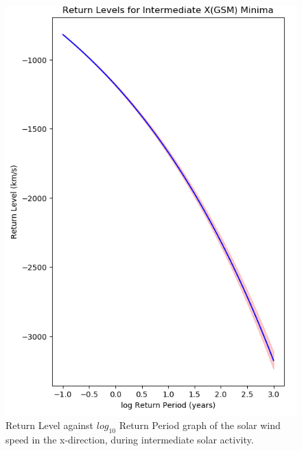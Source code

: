 \documentclass[11pt]{article}
\begin{document}
        \begin{figure}[t!]
            \begin{minipage}{0.48\textwidth}
                \centering
                \includegraphics[width=\textwidth]{fig_method/SWEintXminReturn.png}
                \caption{Return Level against $log_{10}$ Return Period graph of the solar wind speed in the x-direction, during intermediate solar activity.}
                \label{fig:SWEintXminReturn}
            \end{minipage}
            \hfill
            \begin{minipage}{0.48\textwidth}
                \centering

\end{minipage}
\end{figure}
\end{document}
